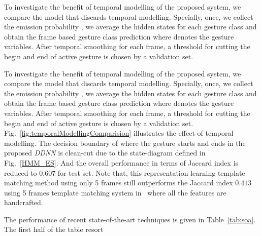 %

%
 To investigate the benefit of temporal modelling of the proposed system, we compare the model that discards temporal modelling. Specially, once, we collect the emission probability \emissionprob{}, we average the hidden states for each gesture class and obtain the frame based gesture class prediction \gestureEmissionProb where \gesturehiddenstateFrame denotes the gesture variables. After temporal smoothing for each frame, a threshold for cutting the begin and end of active gesture is chosen by a validation set.



%

To investigate the benefit of temporal modelling of the proposed system, we compare the model that discards temporal modelling. Specially, once, we collect the emission probability \emissionprob{}, we average the hidden states for each gesture class and obtain the frame based gesture class prediction \gestureEmissionProb where \gesturehiddenstateFrame denotes the gesture variables. After temporal smoothing for each frame, a threshold for cutting the begin and end of active gesture is chosen by a validation set. Fig.~\ref{fig:temporalModellingComparision} illustrates the effect of temporal modelling. The decision boundary of where the gesture starts and ends in the proposed \emph{DDNN} is clean-cut due to the state-diagram defined in Fig.~\ref{HMM_ES}. And the overall performance in terms of  Jaccard index is reduced to $0.607$ for test set. Note that, this representation learning template matching method using only 5 frames still outperforms the Jaccard index $0.413$ using 5 frames template matching system in~\cite{camgoz2014gesture} where all the features are handcrafted.



The performance of recent state-of-the-art techniques is given in Table~\ref{tab:soa}. The first half of the table resort 


